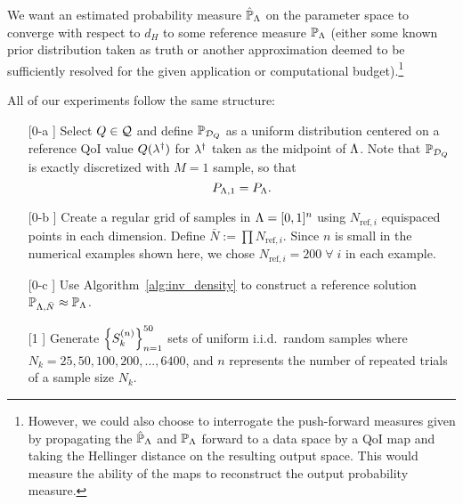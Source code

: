 We want an estimated probability measure $\hat{\mathbb{P}}_{\Lambda}$ on the parameter space to converge with respect to $d_H$ to some reference measure $\mathbb{P}_{\Lambda}$ (either some known prior distribution taken as truth or another approximation deemed to be sufficiently resolved for the given application or computational budget).\footnote{However, we could also choose to interrogate the push-forward measures given by propagating the $\hat{\mathbb{P}}_{\Lambda}$ and $\mathbb{P}_{\Lambda}$ forward to a data space by a QoI map and taking the Hellinger distance on the resulting output space. 
This would measure the ability of the maps to reconstruct the output probability measure.}

All of our experiments follow the same structure:
\begin{itemize}
\item[[0-a]] Select $Q\in\mathcal{Q}$ and define $\mathbb{P}_{\mathcal{D}_Q}$ as a uniform distribution centered on a reference QoI value $Q(\lambda^\dagger)$ for $\lambda^\dagger$ taken as the midpoint of ${\Lambda}$. 
Note that $\mathbb{P}_{\mathcal{D}_Q}$ is exactly discretized with $M=1$ sample, so that 
\[
P_{{\Lambda}, 1} = P_{\Lambda}.
\]
\item[[0-b]] Create a regular grid of samples in ${\Lambda}=[0,1]^n$ using $N_{\text{ref},i}$ equispaced points in each dimension. 
Define $\bar{N} := \prod N_{\text{ref},i}$.
Since $n$ is small in the numerical examples shown here, we chose $N_{\text{ref},i} = 200 \; \forall \; i$ in each example.
\item[[0-c]] Use Algorithm~\ref{alg:inv_density} to construct a reference solution $\mathbb{P}_{{\Lambda},\bar{N}}\approx \mathbb{P}_{\Lambda}$.
\item[[1]] Generate $\left\{S_k^{(n)}\right\}_{n=1}^{50}$ sets of uniform i.i.d.~random samples where $N_k = 25, 50, 100, 200, \hdots, 6400$, and $n$ represents the number of repeated trials of a sample size $N_k$.

\end{itemize}
